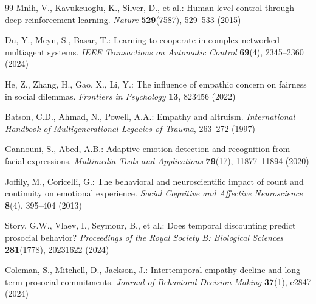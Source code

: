 \documentclass[runningheads]{llncs}
\begin{document}
\begin{thebibliography}{99}
Mnih, V., Kavukcuoglu, K., Silver, D., et al.: Human-level control through deep reinforcement learning. \textit{Nature} \textbf{529}(7587), 529--533 (2015)

Du, Y., Meyn, S., Basar, T.: Learning to cooperate in complex networked multiagent systems. \textit{IEEE Transactions on Automatic Control} \textbf{69}(4), 2345--2360 (2024)

He, Z., Zhang, H., Gao, X., Li, Y.: The influence of empathic concern on fairness in social dilemmas. \textit{Frontiers in Psychology} \textbf{13}, 823456 (2022)

Batson, C.D., Ahmad, N., Powell, A.A.: Empathy and altruism. \textit{International Handbook of Multigenerational Legacies of Trauma}, 263--272 (1997)

Gannouni, S., Abed, A.B.: Adaptive emotion detection and recognition from facial expressions. \textit{Multimedia Tools and Applications} \textbf{79}(17), 11877--11894 (2020)

Joffily, M., Coricelli, G.: The behavioral and neuroscientific impact of count and continuity on emotional experience. \textit{Social Cognitive and Affective Neuroscience} \textbf{8}(4), 395--404 (2013)

Story, G.W., Vlaev, I., Seymour, B., et al.: Does temporal discounting predict prosocial behavior? \textit{Proceedings of the Royal Society B: Biological Sciences} \textbf{281}(1778), 20231622 (2024)

Coleman, S., Mitchell, D., Jackson, J.: Intertemporal empathy decline and long-term prosocial commitments. \textit{Journal of Behavioral Decision Making} \textbf{37}(1), e2847 (2024)

\end{thebibliography}
\end{document}

